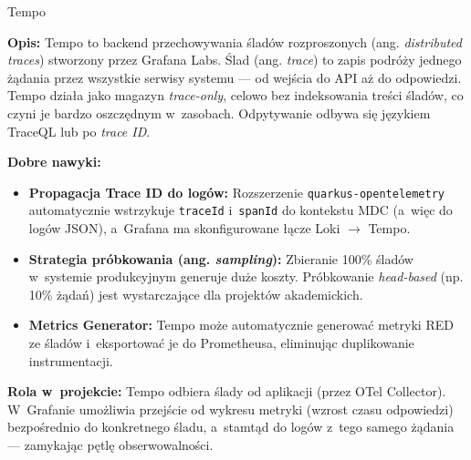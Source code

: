 \begin{techcard}{Tempo}

\textbf{Opis:} Tempo to backend przechowywania śladów rozproszonych (ang. \textit{distributed traces}) stworzony przez Grafana Labs. Ślad (ang. \textit{trace}) to zapis podróży jednego żądania przez wszystkie serwisy systemu --- od wejścia do API aż do odpowiedzi. Tempo działa jako magazyn \textit{trace-only}, celowo bez indeksowania treści śladów, co czyni je bardzo oszczędnym w~zasobach. Odpytywanie odbywa się językiem TraceQL lub po \textit{trace ID}.

\textbf{Dobre nawyki:}
\begin{itemize}
  \item \textbf{Propagacja Trace ID do logów:} Rozszerzenie \texttt{quarkus-opentelemetry} automatycznie wstrzykuje \texttt{traceId} i~\texttt{spanId} do kontekstu MDC (a~więc do logów JSON), a~Grafana ma skonfigurowane łącze Loki $\rightarrow$ Tempo.
  \item \textbf{Strategia próbkowania (ang. \textit{sampling}):} Zbieranie 100\% śladów w~systemie produkcyjnym generuje duże koszty. Próbkowanie \textit{head-based} (np. 10\% żądań) jest wystarczające dla projektów akademickich.
  \item \textbf{Metrics Generator:} Tempo może automatycznie generować metryki RED ze śladów i~eksportować je do Prometheusa, eliminując duplikowanie instrumentacji.
\end{itemize}

\textbf{Rola w~projekcie:} Tempo odbiera ślady od aplikacji (przez OTel Collector). W~Grafanie umożliwia przejście od wykresu metryki (wzrost czasu odpowiedzi) bezpośrednio do konkretnego śladu, a~stamtąd do logów z~tego samego żądania --- zamykając pętlę obserwowalności.

\end{techcard}

